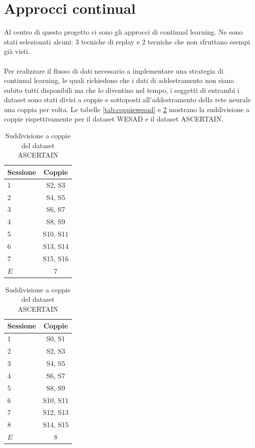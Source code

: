 \section{Approcci continual}
Al centro di questo progetto ci sono gli approcci di continual learning. Ne sono stati selezionati alcuni: 3 tecniche di replay e 2 tecniche che non sfruttano esempi già visti.\\\\
Per realizzare il flusso di dati necessario a implementare una strategia di continual learning, le quali richiedono che i dati di addestramento non siano subito tutti disponibili ma che lo diventino nel tempo, i soggetti di entrambi i dataset sono stati divisi a coppie e sottoposti all'addestramento della rete neurale una coppia per volta. Le tabelle \ref{tab:coppiewesad} e \ref{tab:coppieascertain} mostrano la suddivisione a coppie rispettivamente per il dataset WESAD e il dataset ASCERTAIN.
\begin{table}[h]
    \parbox{.45\linewidth}{
    	\begin{center}
    		\begin{tabular}{l|c}
    		     \textbf{Sessione} & \textbf{Coppie}\\
    		     \hline
    		     1 & S2, S3 \\
    		     2 & S4, S5 \\
    		     3 & S6, S7 \\
    		     4 & S8, S9 \\
    		     5 & S10, S11 \\
    		     6 & S13, S14 \\
    		     7 & S15, S16 \\
    		     \hline
    		     $E$ & 7
    		\end{tabular}
    		\caption{Suddivisione a coppie del dataset WESAD}
    		\label{tab:coppiewesad}
    	\end{center}
	}
    \parbox{.45\linewidth}{
    	\begin{center}
    		\begin{tabular}{l|c}
    		     \textbf{Sessione} & \textbf{Coppie}\\
    		     \hline
    		     1 & S0, S1 \\
    		     2 & S2, S3 \\
    		     3 & S4, S5 \\
    		     4 & S6, S7 \\
    		     5 & S8, S9 \\
    		     6 & S10, S11 \\
    		     7 & S12, S13 \\
    		     8 & S14, S15 \\
    		     \hline
    		     $E$ & 8
    		\end{tabular}
    		\caption{Suddivisione a coppie del dataset ASCERTAIN}
    		\label{tab:coppieascertain}
    	\end{center}
    }
\end{table}

